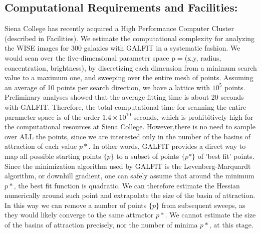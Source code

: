 \documentclass[12pt, preprint]{aastex}
\begin{document}
{\subsection{Computational Requirements and
  Facilities:   \label{comp}}
\vspace*{-.4cm}
Siena College has recently acquired a High Performance  Computer
Cluster  (described in Facilities). 
We estimate the computational complexity for analyzing the WISE images
for 300 
galaxies with GALFIT in a systematic fashion. We would scan over the
five-dimensional parameter space  p$=$(x,y, radius, concentration,
brightness), by discretizing each dimension from a minimum search
value to a maximum one, and sweeping over the entire mesh of points.
Assuming an average of 10 points per search direction, we have a
lattice with $10^5$ points. Preliminary analyses showed that the average
fitting time is about 20 seconds with GALFIT. Therefore, the total
computational time  for scanning the entire parameter space is of the
order $1.4 \times 10^{10}$ seconds, which is  prohibitively high for the
computational resources at Siena College. However,there is no need to
sample over ALL the points, since we are interested only in the number
of the basins of attraction of each value $p*$. In other words, GALFIT
provides a direct way to map all possible starting points $\{p\}$ to a
subset of points $\{p*\}$ of 'best fit' points. Since the minimization
algorithm used by GALFIT is  the Levenberg-Marquardt algorithm, or
downhill gradient, one can safely assume that around the minimum $p*$,
the best fit function is quadratic. We can therefore estimate the
Hessian numerically around such point and extrapolate the size of the
basin of attraction. In this way we can remove a number of points $\{p\}$
from subsequent sweeps, as they would likely converge to the same attractor
$p*$. We cannot estimate the size of the basins of
attraction precisely, nor the number of minima $p*$, at this stage. 

}
\end{document}
